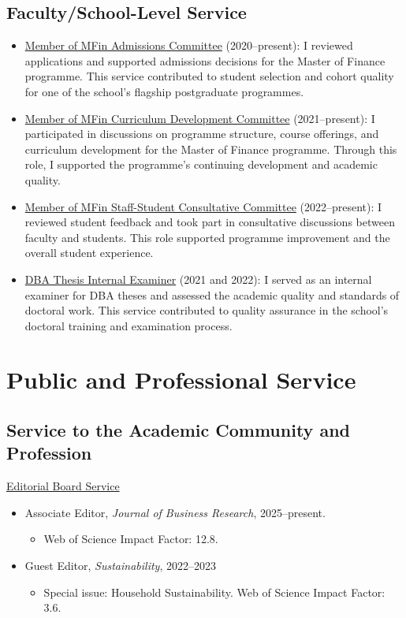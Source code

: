 \documentclass[11pt]{article}
\begin{document}
\subsection{Faculty/School-Level Service}
\begin{itemize}
\item \underline{Member of MFin Admissions Committee} (2020--present): I reviewed applications and supported admissions decisions for the Master of Finance programme. This service contributed to student selection and cohort quality for one of the school's flagship postgraduate programmes.
\item \underline{Member of MFin Curriculum Development Committee} (2021--present): I participated in discussions on programme structure, course offerings, and curriculum development for the Master of Finance programme. Through this role, I supported the programme's continuing development and academic quality.
\item \underline{Member of MFin Staff-Student Consultative Committee} (2022--present): I reviewed student feedback and took part in consultative discussions between faculty and students. This role supported programme improvement and the overall student experience.
\item \underline{DBA Thesis Internal Examiner} (2021 and 2022): I served as an internal examiner for DBA theses and assessed the academic quality and standards of doctoral work. This service contributed to quality assurance in the school's doctoral training and examination process.
\end{itemize}

\section{Public and Professional Service}
\subsection{Service to the Academic Community and Profession}
\underline{Editorial Board Service}
\begin{itemize}
\item Associate Editor, \textcolor{blue!70!black}{\emph{Journal of Business Research}}, 2025--present. 
\begin{itemize}
	\item Web of Science Impact Factor: 12.8.
\end{itemize}
\item Guest Editor, \textcolor{blue!70!black}{\emph{Sustainability}}, 2022--2023
\begin{itemize}
	\item Special issue: Household Sustainability. Web of Science Impact Factor: 3.6.
\end{itemize}
\end{itemize}
\end{document}
